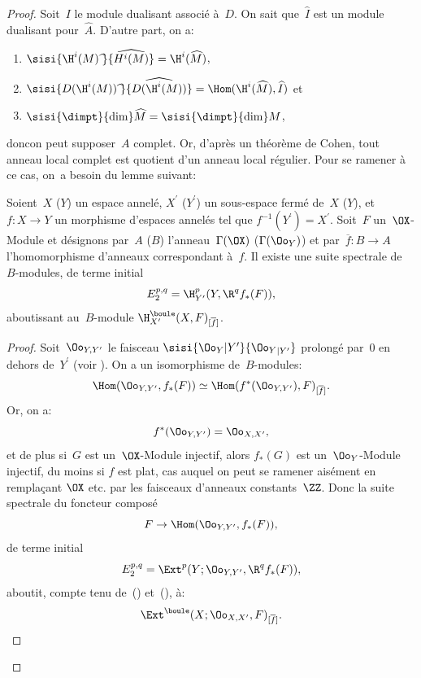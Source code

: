 \begin{proof}
Soit~$I$ le module dualisant associ\'e \`a~$D$. On sait que~$\widehat{I}$ est un module dualisant pour~$\widehat{A}$. D'autre part, on a:
\begin{enumerate}
\item[] $\sisi{\H^{i}(M)\;\widehat{\hbox{}}}{\widehat{H^i(M)}}=\H^{i}(\widehat{M})$,
\item[] $\sisi{D(\H^{i}(M))\;\widehat{\hbox{}}}{\widehat{D(\H^{i}(M))}}=\Hom(\H^{i}(\widehat{M}), \widehat{I})$ et
\item[] $\sisi{\dimpt}{\dim}\widehat{M}=\sisi{\dimpt}{\dim} M$,
\end{enumerate}
\noindent
donc\pageoriginale on peut supposer~$A$ complet. Or, d'apr\`es un th\'eor\`eme de Cohen, tout anneau local complet est quotient d'un anneau local r\'egulier. Pour se ramener \`a ce cas, on~a besoin du lemme suivant:

\begin{lemme} \label{V.3.2}
Soient~$X$ (\resp $Y$) un espace annel\'e, $X^{\prime}$ (\resp $Y^{\prime}$) un sous-espace ferm\'e de~$X$ (\resp $Y$), et $f\colon X\to Y$ un morphisme d'espaces annel\'es tel que $f^{-1}(Y^{\prime})=X^{\prime}$. Soit~$F$ un~$\OX$-Module et d\'esignons par~$A$ (\resp $B$) l'anneau~$\Gamma(\OX)$ (\resp $\Gamma(\Oo_{Y})$) et par~$\overline{f}\colon B\to A$ l'homomorphisme d'anneaux correspondant \`a~$f$. Il existe une suite spectrale de~$B$-modules, de terme initial
\begin{equation} \label{eq:V.15} E_{2}^{p, q}=\H_{Y^{\prime}}^{p}(Y, \R^{q}f_{\ast}(F)),
\end{equation}
aboutissant au~$B$-module $\H_{X^{\prime}}^{\boule}(X, F)_{[\overline{f}]}$.
\end{lemme}

\begin{proof}
Soit~$\Oo_{Y, Y^{\prime}}$ le faisceau $\sisi{{\Oo_{Y}}{|Y^{\prime}}}{{\Oo_{Y}}_{|Y^{\prime}}}$ prolong\'e par~$0$ en dehors de~$Y^{\prime}$ (voir \Exp {}). On a un isomorphisme de~$B$-modules:
\begin{equation} \label{eq:V.16} \Hom(\Oo_{Y, Y^{\prime}}, f_{\ast}(F))\simeq\Hom(f^{\ast}(\Oo_{Y, Y^{\prime}}), F)_{[\overline{f}]}.
\end{equation}
Or, on a:
\begin{equation} \label{eq:V.17} f^{\ast}(\Oo_{Y, Y^{\prime}})=\Oo_{X, X^{\prime}},
\end{equation}
et de plus si~$G$ est un~$\OX$-Module injectif, alors
$f_{\ast}(G)$ est un~$\Oo_{Y}$-Module injectif, du moins si $f$
est plat, cas auquel on peut se ramener ais\'ement en rempla\c cant
$\OX$ etc. par les faisceaux d'anneaux constants~$\ZZ$. Donc la
suite spectrale du foncteur compos\'e
$$F\to\Hom(\Oo_{Y, Y^{\prime}}, f_{\ast}(F)),
$$
de terme initial
$$E_{2}^{p, q}=\Ext^{p}(Y;\Oo_{Y, Y^{\prime}}, \R^{q}f_{\ast}(F)),
$$
aboutit, compte tenu de~() et~(), \`a:
$$
\Ext^{\boule}(X;\Oo_{X, X^{\prime}}, F)_{[\overline{f}]}.
$$


\end{proof}
\end{proof}
